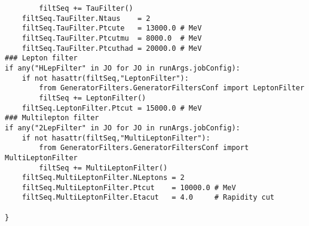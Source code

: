 \begin{tiny}
\begin{verbatim}
        filtSeq += TauFilter()
    filtSeq.TauFilter.Ntaus    = 2
    filtSeq.TauFilter.Ptcute   = 13000.0 # MeV
    filtSeq.TauFilter.Ptcutmu  = 8000.0  # MeV
    filtSeq.TauFilter.Ptcuthad = 20000.0 # MeV
### Lepton filter
if any("HLepFilter" in JO for JO in runArgs.jobConfig):
    if not hasattr(filtSeq,"LeptonFilter"):
        from GeneratorFilters.GeneratorFiltersConf import LeptonFilter
        filtSeq += LeptonFilter()
    filtSeq.LeptonFilter.Ptcut = 15000.0 # MeV
### Multilepton filter
if any("2LepFilter" in JO for JO in runArgs.jobConfig):
    if not hasattr(filtSeq,"MultiLeptonFilter"):
        from GeneratorFilters.GeneratorFiltersConf import MultiLeptonFilter
        filtSeq += MultiLeptonFilter()
    filtSeq.MultiLeptonFilter.NLeptons = 2
    filtSeq.MultiLeptonFilter.Ptcut    = 10000.0 # MeV
    filtSeq.MultiLeptonFilter.Etacut   = 4.0     # Rapidity cut

}

\end{verbatim}
\end{tiny}
